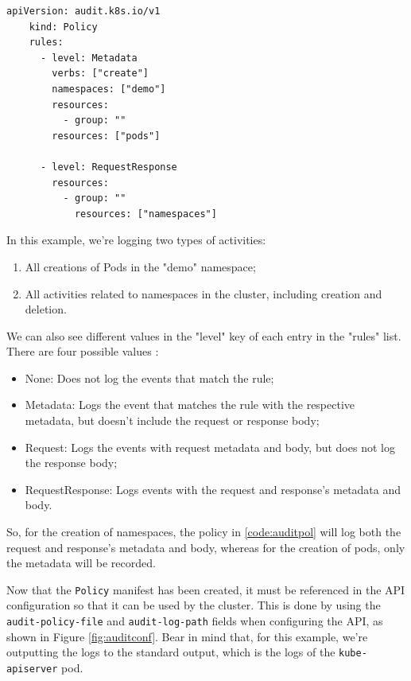\documentclass[a4paper,11pt,openright,BCOR=15mm]{scrbook}
\begin{document}
\begin{lstlisting}[style=yaml,caption={ResourceQuota example},label=code:auditpol]
	apiVersion: audit.k8s.io/v1
	kind: Policy
	rules:
	  - level: Metadata
	    verbs: ["create"]
	    namespaces: ["demo"] 
	    resources:
	      - group: ""   
	    resources: ["pods"]
	
	  - level: RequestResponse 
	    resources:
	      - group: ""
	        resources: ["namespaces"]
\end{lstlisting}

In this example, we're logging two types of activities:
\begin{enumerate}
	\item All creations of Pods in the "demo" namespace;
	\item All activities related to namespaces in the cluster, including creation and deletion.
\end{enumerate}

We can also see different values in the "level" key of each entry in the "rules" list. There are four possible values \cite{the_linux_foundation_auditing_2024}:
\begin{itemize}
	\item None: Does not log the events that match the rule;
	\item Metadata: Logs the event that matches the rule with the respective metadata, but doesn't include the request or response body;
	\item Request: Logs the events with request metadata and body, but does not log the response body;
	\item RequestResponse: Logs events with the request and response's metadata and body.
\end{itemize}

So, for the creation of namespaces, the policy in \ref{code:auditpol} will log both the request and response's metadata and body, whereas for the creation of pods, only the metadata will be recorded.

Now that the \texttt{Policy} manifest has been created, it must be referenced in the API configuration so that it can be used by the cluster. This is done by using the \texttt{audit-policy-file} and \texttt{audit-log-path} fields when configuring the API, as shown in Figure \ref{fig:auditconf}. Bear in mind that, for this example, we're outputting the logs to the standard output, which is the logs of the \texttt{kube-apiserver} pod.
\end{document}
